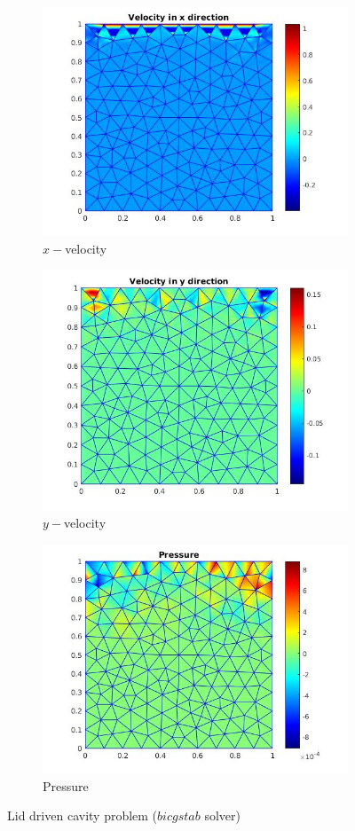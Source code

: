 \documentclass[a4paper,twoside,openright]{book}
\begin{document}
\begin{figure}
\begin{subfigure}{\textwidth}	
  \includegraphics[width=0.8\linewidth]{lid_bicgstab_vx.jpg}
  \caption{$x-$velocity} 
  \label{x_vel_stoke_bicgstab_lid}
\end{subfigure}
\begin{subfigure}{\textwidth}	
  \includegraphics[width=0.8\linewidth]{lid_bicgstab_vy.jpg}
  \caption{$y-$velocity} 
  \label{y_vel_stoke_bicgstab_lid}
\end{subfigure}
\begin{subfigure}{\textwidth}	
  \includegraphics[width=0.8\linewidth]{lid_bicgstab_pressure.jpg}
  \caption{Pressure} 
  \label{pressure_stoke_bicgstab_lid}
\end{subfigure}
\caption{Lid driven cavity problem ($bicgstab$ solver)}
\label{stoke_bicgstab_lid}
\end{figure}
\end{document}
